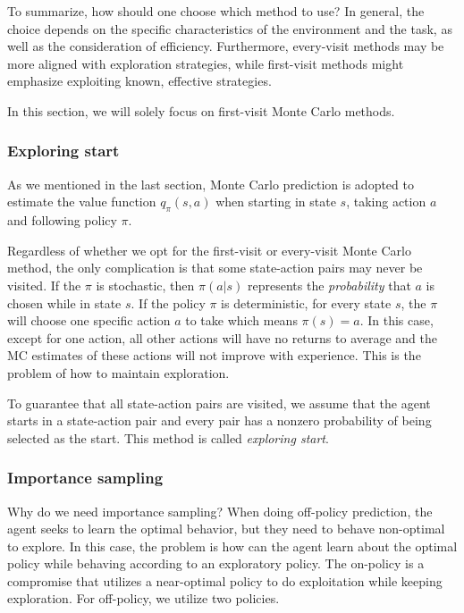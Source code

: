To summarize, how should one choose which method to use? In general, the choice depends on the specific characteristics of the environment and the task, as well as the consideration of efficiency. Furthermore, every-visit methods may be more aligned with exploration strategies, while first-visit methods might emphasize exploiting known, effective strategies.

In this section, we will solely focus on first-visit Monte Carlo methods.

\subsubsection*{Exploring start}\label{sec:exploring-start}

As we mentioned in the last section, Monte Carlo prediction is adopted to estimate the value function $q_\pi(s,a)$ when starting in state $s$, taking action $a$ and following policy $\pi$.

Regardless of whether we opt for the first-visit or every-visit Monte Carlo method, the only complication is that some state-action pairs may never be visited. If the $\pi$ is stochastic, then $\pi(a|s)$ represents the \emph{probability} that $a$ is chosen while in state $s$. If the policy $\pi$ is deterministic, for every state $s$, the $\pi$ will choose one specific action $a$ to take which means $\pi(s)=a$. In this case, except for one action, all other actions will have no returns to average and the MC estimates of these actions will not improve with experience. This is the problem of how to maintain exploration.

To guarantee that all state-action pairs are visited, we assume that the agent starts in a state-action pair and every pair has a nonzero probability of being selected as the start. This method is called \emph{exploring start}.

\subsubsection*{Importance sampling}\label{sec:importance-sampling}

Why do we need importance sampling? When doing off-policy prediction, the agent seeks to learn the optimal behavior, but they need to behave non-optimal to explore. In this case, the problem is how can the agent learn about the optimal policy while behaving according to an exploratory policy. The on-policy is a compromise that utilizes a near-optimal policy to do exploitation while keeping exploration. For off-policy, we utilize two policies.

